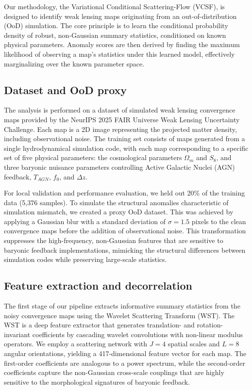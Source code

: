 \documentclass[]{article}
\begin{document}
Our methodology, the Variational Conditional Scattering-Flow (VCSF), is designed to identify weak lensing maps originating from an out-of-distribution (OoD) simulation. The core principle is to learn the conditional probability density of robust, non-Gaussian summary statistics, conditioned on known physical parameters. Anomaly scores are then derived by finding the maximum likelihood of observing a map's statistics under this learned model, effectively marginalizing over the known parameter space.

\subsection{Dataset and OoD proxy}
The analysis is performed on a dataset of simulated weak lensing convergence maps provided by the NeurIPS 2025 FAIR Universe Weak Lensing Uncertainty Challenge. Each map is a 2D image representing the projected matter density, including observational noise. The training set consists of maps generated from a single hydrodynamical simulation code, with each map corresponding to a specific set of five physical parameters: the cosmological parameters $\Omega_m$ and $S_8$, and three baryonic nuisance parameters controlling Active Galactic Nuclei (AGN) feedback, $T_{AGN}$, $f_0$, and $\Delta z$.

For local validation and performance evaluation, we held out 20\% of the training data (5,376 samples). To simulate the structural anomalies characteristic of simulation mismatch, we created a proxy OoD dataset. This was achieved by applying a Gaussian blur with a standard deviation of $\sigma = 1.5$ pixels to the clean convergence maps before the addition of observational noise. This transformation suppresses the high-frequency, non-Gaussian features that are sensitive to baryonic feedback implementations, mimicking the structural differences between simulation codes while preserving large-scale statistics.

\subsection{Feature extraction and decorrelation}
The first stage of our pipeline extracts informative summary statistics from the noisy convergence maps using the Wavelet Scattering Transform (WST). The WST is a deep feature extractor that generates translation- and rotation-invariant coefficients by cascading wavelet convolutions with non-linear modulus operators. We employ a scattering network with $J=4$ spatial scales and $L=8$ angular orientations, yielding a 417-dimensional feature vector for each map. The first-order coefficients are analogous to a power spectrum, while the second-order coefficients capture the non-Gaussian cross-scale couplings that are highly sensitive to the morphological signatures of baryonic feedback.
\end{document}
